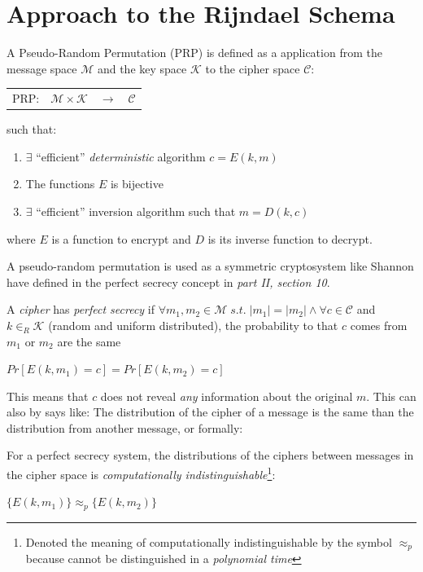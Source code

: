 \documentclass[10pt,a4paper,twoside]{llncs}
\begin{document}
\section{Approach to the Rijndael Schema}\label{sec:approach}
\begin{definition}\label{def:PRP}
 A Pseudo-Random Permutation (PRP) is defined as a application from the message space $\mathcal{M}$ and the key space $\mathcal{K}$ to the cipher space $\mathcal{C}$:
 \begin{center}
  \begin{tabular}{llll}
   PRP: & $\mathcal{M} \times \mathcal{K}$ & $\rightarrow$ & $\mathcal{C}$ \\
  \end{tabular}
 \end{center}
 such that:
 \begin{enumerate}
  \item $\exists$ ``efficient'' \emph{deterministic} algorithm $c=E(k,m)$
  \item The functions $E$ is bijective
  \item $\exists$ ``efficient'' inversion algorithm such that $m=D(k,c)$
 \end{enumerate}
\end{definition}

where $E$ is a function to encrypt and $D$ is its inverse function to decrypt.

A pseudo-random permutation is used as a symmetric cryptosystem like Shannon have defined in \cite{shannon-comTheorySecSys} the perfect secrecy concept in \emph{part II, section 10}.
\begin{definition}\label{def:shannonPerfectSecrecy}
 A \emph{cipher} has \emph{perfect secrecy} if $\forall m_1, m_2 \in \mathcal{M} \;s.t.\; \left| m_1 \right| = \left| m_2 \right| \wedge \forall c \in \mathcal{C}$ and  $k\in_R\mathcal{K}$ (random and uniform distributed), the probability to that $c$ comes from $m_1$ or $m_2$ are the same
 \begin{center}
  $Pr[E(k,m_1)=c] = Pr[E(k,m_2)=c]$
 \end{center}
\end{definition}

This means that $c$ does not reveal \emph{any} information about the original $m$. This can also by says like: The distribution of the cipher of a message is the same than the distribution from another message, or formally:
\begin{definition}
 For a perfect secrecy system, the distributions of the ciphers between messages in the cipher space is \emph{computationally indistinguishable}\footnote{Denoted the meaning of computationally indistinguishable by the symbol $\approx_p$ because cannot be distinguished in a \emph{polynomial time}}:
 \begin{center}
  $\{ E(k,m_1) \} \approx_p \{ E(k,m_2) \} $
 \end{center}
\end{definition}
\end{document}
